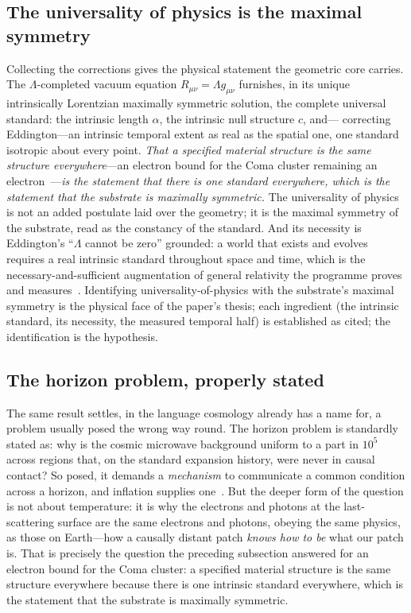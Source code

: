 \documentclass[11pt,a4paper]{article}
\theoremstyle{definition}
\begin{document}
\subsection{The universality of physics is the maximal symmetry}

Collecting the corrections gives the physical statement the geometric core
carries. The $\Lambda$-completed vacuum equation
$R_{\mu\nu}=\Lambda g_{\mu\nu}$ furnishes, in its unique intrinsically
Lorentzian maximally symmetric solution, the complete universal standard:
the intrinsic length $\alpha$, the intrinsic null structure $c$, and---%
correcting Eddington---an intrinsic temporal extent as real as the spatial
one, one standard isotropic about every point. \emph{That a specified
material structure is the same structure everywhere}---an electron bound for
the Coma cluster remaining an electron~\cite{JanzenThesis}---\emph{is the
statement that there is one standard everywhere, which is the statement that
the substrate is maximally symmetric.} The universality of physics is not an
added postulate laid over the geometry; it is the maximal symmetry of the
substrate, read as the constancy of the standard. And its necessity is
Eddington's ``$\Lambda$ cannot be zero'' grounded: a world that exists and
evolves requires a real intrinsic standard throughout space and time, which
is the necessary-and-sufficient augmentation of general relativity the
programme proves and measures~\cite{JanzenModernParallax,JanzenCRframework}.
Identifying universality-of-physics with the
substrate's maximal symmetry is the physical face of the paper's thesis;
each ingredient (the intrinsic standard, its necessity, the measured
temporal half) is established as cited; the identification is the hypothesis.

\subsection{The horizon problem, properly stated}

The same result settles, in the language cosmology already has a name for, a
problem usually posed the wrong way round. The horizon problem is standardly
stated as: why is the cosmic microwave background uniform to a part in
$10^{5}$ across regions that, on the standard expansion history, were never
in causal contact? So posed, it demands a \emph{mechanism} to communicate a
common condition across a horizon, and inflation supplies one~\cite{Guth1981}. But the deeper
form of the question is not about temperature: it is why the electrons and
photons at the last-scattering surface are the same electrons and photons,
obeying the same physics, as those on Earth---how a causally distant patch
\emph{knows how to be} what our patch is. That is precisely the question the
preceding subsection answered for an electron bound for the Coma cluster: a
specified material structure is the same structure everywhere because there
is one intrinsic standard everywhere, which is the statement that the
substrate is maximally symmetric.
\end{document}

